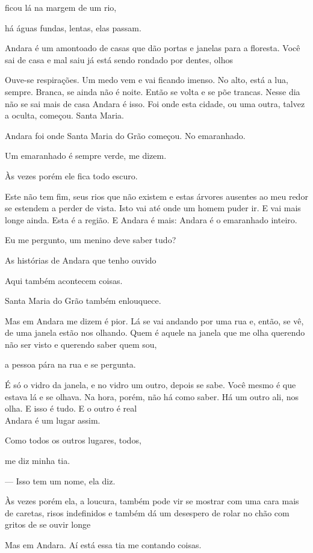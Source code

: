 ficou lá na margem de um rio,

há águas fundas, lentas, elas passam.

Andara é um amontoado de casas que dão portas e janelas para a floresta.
Você sai de casa e mal saiu já está sendo rondado por dentes, olhos

Ouve-se respirações. Um medo vem e vai ficando imenso. No alto, está a
lua, sempre. Branca, se ainda não é noite. Então se volta e se põe
trancas. Nesse dia não se sai mais de casa Andara é isso. Foi onde esta
cidade, ou uma outra, talvez a oculta, começou. Santa Maria.

Andara foi onde Santa Maria do Grão começou. No emaranhado.

Um emaranhado é sempre verde, me dizem.

Às vezes porém ele fica todo escuro.

Este não tem fim, seus rios que não existem e estas árvores ausentes ao
meu redor se estendem a perder de vista. Isto vai até onde um homem
puder ir. E vai mais longe ainda. Esta é a região. E Andara é mais:
Andara é o emaranhado inteiro.

Eu me pergunto, um menino deve saber tudo?

As histórias de Andara que tenho ouvido

Aqui também acontecem coisas.

Santa Maria do Grão também enlouquece.

Mas em Andara me dizem é pior. Lá se vai andando por uma rua e, então,
se vê, de uma janela estão nos olhando. Quem é aquele na janela que me
olha querendo não ser visto e querendo saber quem sou,

a pessoa pára na rua e se pergunta.

É só o vidro da janela, e no vidro um outro, depois se sabe. Você mesmo
é que estava lá e se olhava. Na hora, porém, não há como saber. Há um
outro ali, nos olha. E isso é tudo. E o outro é real\\

Andara é um lugar assim.

Como todos os outros lugares, todos,

me diz minha tia.

--- Isso tem um nome, ela diz.

Às vezes porém ela, a loucura, também pode vir se mostrar com uma cara
mais de caretas, risos indefinidos e também dá um desespero de rolar no
chão com gritos de se ouvir longe

Mas em Andara. Aí está essa tia me contando coisas.

